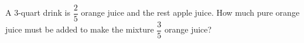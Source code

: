 A 3-quart drink is $\dfrac{2}{5}$ orange juice and the rest apple juice. How much pure orange juice must be added to make the mixture $\dfrac{3}{5}$ orange juice?
